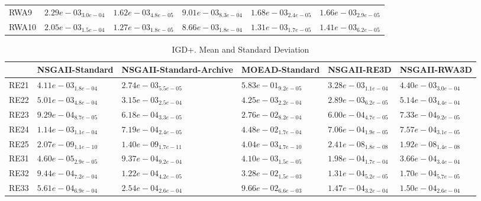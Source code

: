 \documentclass{article}
\begin{document}
\begin{table}
\begin{scriptsize}
\begin{tabular}{llllll}
RWA9 & $  2.29e-03_{ 3.0e-04}$ & \cellcolor{gray95}$  1.62e-03_{ 4.8e-05}$ & $  9.01e-03_{ 8.3e-04}$ & $  1.68e-03_{ 2.4e-05}$ & \cellcolor{gray25}$  1.66e-03_{ 2.9e-05}$ \\
RWA10 & $  2.05e-03_{ 1.5e-04}$ & \cellcolor{gray95}$  1.27e-03_{ 1.8e-05}$ & $  8.66e-03_{ 1.8e-04}$ & \cellcolor{gray25}$  1.31e-03_{ 1.7e-05}$ & $  1.41e-03_{ 6.2e-05}$ \\
\hline
\end{tabular}
\end{scriptsize}
\end{table}

\begin{table}
\caption{IGD+. Mean and Standard Deviation}
\label{table: IGD+}
\centering
\begin{scriptsize}
\begin{tabular}{llllll}
\hline & NSGAII-Standard & NSGAII-Standard-Archive & MOEAD-Standard & NSGAII-RE3D &  NSGAII-RWA3D\\
\hline 
RE21 & $  4.11e-03_{ 1.8e-04}$ & \cellcolor{gray95}$  2.74e-03_{ 5.5e-05}$ & $  5.83e-01_{ 9.2e-05}$ & \cellcolor{gray25}$  3.28e-03_{ 1.1e-04}$ & $  4.40e-03_{ 3.0e-04}$ \\
RE22 & $  5.01e-03_{ 4.8e-04}$ & \cellcolor{gray25}$  3.15e-03_{ 2.5e-04}$ & $  4.25e-03_{ 2.2e-04}$ & \cellcolor{gray95}$  2.89e-03_{ 6.2e-05}$ & $  5.14e-03_{ 4.4e-04}$ \\
RE23 & $  9.29e-04_{ 8.7e-05}$ & \cellcolor{gray25}$  6.18e-04_{ 3.3e-05}$ & $  2.76e-02_{ 8.2e-04}$ & \cellcolor{gray95}$  6.00e-04_{ 4.7e-05}$ & $  7.33e-04_{ 9.2e-05}$ \\
RE24 & $  1.14e-03_{ 1.1e-04}$ & \cellcolor{gray25}$  7.19e-04_{ 2.4e-05}$ & $  4.48e-02_{ 1.7e-04}$ & \cellcolor{gray95}$  7.06e-04_{ 1.9e-05}$ & $  7.57e-04_{ 3.1e-05}$ \\
RE25 & \cellcolor{gray25}$  2.07e-09_{ 1.1e-10}$ & \cellcolor{gray95}$  1.40e-09_{ 1.7e-11}$ & $  4.04e-03_{ 4.7e-10}$ & $  2.41e-08_{ 1.8e-08}$ & $  1.92e-08_{ 1.4e-08}$ \\
RE31 & \cellcolor{gray95}$  4.60e-05_{ 2.9e-05}$ & $  9.37e-04_{ 9.2e-04}$ & $  4.10e-03_{ 1.5e-05}$ & \cellcolor{gray25}$  1.98e-04_{ 1.7e-04}$ & $  3.66e-04_{ 3.4e-04}$ \\
RE32 & $  9.44e-04_{ 7.2e-04}$ & \cellcolor{gray95}$  1.22e-04_{ 4.2e-05}$ & $  3.28e-02_{ 1.5e-03}$ & \cellcolor{gray25}$  1.31e-04_{ 5.2e-05}$ & $  1.70e-04_{ 5.7e-05}$ \\
RE33 & $  5.61e-04_{ 6.9e-04}$ & $  2.54e-04_{ 2.6e-04}$ & $  9.66e-02_{ 6.6e-03}$ & \cellcolor{gray95}$  1.47e-04_{ 3.2e-04}$ & \cellcolor{gray25}$  1.50e-04_{ 2.6e-04}$ \\

\end{tabular}
\end{scriptsize}
\end{table}
\end{document}
